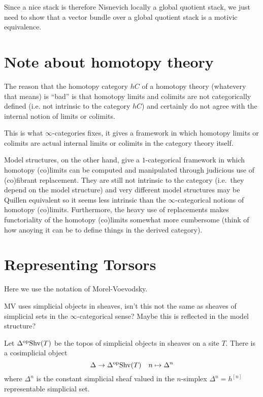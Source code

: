 \documentclass[12pt]{article}
\begin{document}
\begin{rmk}
Since a nice stack is therefore Nisnevich locally a global quotient stack, we just need to show that a vector bundle over a global quotient stack is a motivic equivalence.
\end{rmk}

\section{Note about homotopy theory}


\newcommand{\Shv}{\mathrm{Shv}}


The reason that the homotopy category $h C$ of a homotopy theory (whatevery that means) is ``bad'' is that homotopy limits and colimits are not categorically defined (i.e. not intrinsic to the category $h C$) and certainly do not agree with the internal notion of limits or colimits. 
\par 
This is what $\infty$-categories fixes, it gives a framework in which homotopy limits or colimits are actual internal limits or colimits in the category theory itself. 
\par 
Model structures, on the other hand, give a $1$-categorical framework in which homotopy (co)limits can be computed and manipulated through judicious use of (co)fibrant replacement. They are still not intrinsic to the category (i.e.\ they depend on the model structure) and very different model structures may be Quillen equivalent so it seems less intrinsic than the $\infty$-categorical notions of homotopy (co)limits. Furthermore, the heavy use of replacements makes functoriality of the homotopy (co)limits somewhat more cumbersome (think of how anoying it can be to define things in the derived category). 



\section{Representing Torsors}

Here we use the notation of Morel-Voevodsky. 

{\color{red} MV uses simplicial objects in sheaves, isn't this not the same as sheaves of simplicial sets in the $\infty$-categorical sense? Maybe this is reflected in the model structure?}

Let $\Delta^{\op} \Shv(T)$ be the topos of simplicial objects in sheaves on a site $T$. There is a cosimplicial object 
\[ \Delta \to \Delta^{\op} \Shv(T) \quad n \mapsto \Delta^n \]
where $\Delta^n$ is the constant simplicial sheaf valued in the $n$-simplex $\Delta^n = h^{[n]}$ representable simplicial set.
\end{document}
